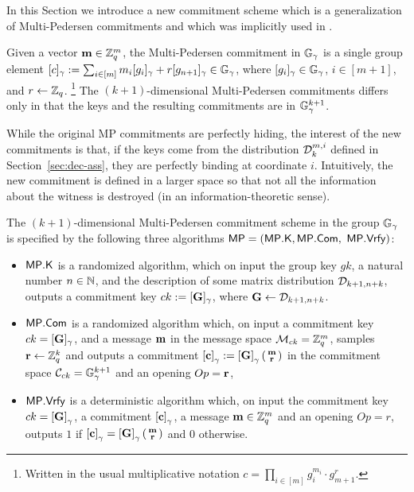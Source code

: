 In this Section we introduce a new commitment scheme which is a generalization of Multi-Pedersen commitments and which was implicitly used in \cite{EPRINT:GonHevRaf15}. 

Given a vector $\mathbf{m}\in\mathbb{Z}_q^m$, the Multi-Pedersen commitment in $\mathbb{G}_{\gamma}$ is a single group element $[c]_\gamma:=\sum_{i\in [m]} m_i[g_i]_\gamma+r[g_{n+1}]_\gamma \in\mathbb{G}_\gamma$, where $[g_i]_{\gamma}\in\mathbb{G}_\gamma$, $i\in[m+1]$, and $r\gets\mathbb{Z}_q$. \footnote{Written in the usual multiplicative notation $c=\prod_{i\in[m]}g_i^{m_i} \cdot g_{m+1}^r$.}  The $(k+1)$-dimensional Multi-Pedersen commitments 
differs only in that the keys and the resulting commitments are in 
$\mathbb{G}_{\gamma}^{k+1}$. 


While the original MP commitments are perfectly hiding, the interest of the new commitments is that, if the keys come from the distribution $\mathcal{D}_k^{m,i}$ defined in Section~\ref{sec:dec-ass}, they are perfectly binding at coordinate $i$. Intuitively, the new commitment is defined in a larger space so that not all the information about the witness is destroyed (in an information-theoretic sense). 

\begin{definition} The $(k+1)$-dimensional Multi-Pedersen commitment scheme in the group $\mathbb{G}_\gamma$ 
is specified by the following three algorithms 
	$\mathsf{MP}=(\mathsf{MP}.\mathsf{K},\mathsf{MP}.\mathsf{Com},$ $ \mathsf{MP}.\mathsf{Vrfy})$:
	\begin{itemize} 
		\item  $\mathsf{MP}.\mathsf{K}$ is a randomized algorithm, which on input the group key $gk$, a natural number $n \in \mathbb{N}$, and the description of some matrix distribution $\mathcal{D}_{k+1,n+k}$, 
		outputs a commitment key $ck:=[\mathbf{{G}}]_\gamma$, where $\mathbf{{G}} \gets \mathcal{D}_{k+1,n+k}$.
		\item $\mathsf{MP}.\mathsf{Com}$ is a randomized algorithm which, on input a commitment key $ck=[\mathbf{{G}}]_\gamma$, and a message 
		$\mathbf{m}$ in the message space $\mathcal{M}_{ck}=\mathbb{Z}_q^{m}$, samples $\mathbf{r} \gets \mathbb{Z}_q^k$ and outputs a commitment $\left[\mathbf{c}\right]_\gamma:=\left[\mathbf{{G}}\right]_\gamma\left(\begin{smallmatrix}\mathbf{m} \\ \mathbf{r}\end{smallmatrix}\right)$ in the commitment space $\mathcal{C}_{ck}=\mathbb{G}_\gamma^{k+1}$ and an opening $Op=\mathbf{r}$, 
		\item $\mathsf{MP}.\mathsf{Vrfy}$ is a deterministic algorithm which, on input the commitment key $ck=\left[\mathbf{{G}}\right]_\gamma$, a commitment $\left[\mathbf{c}\right]_\gamma$,  a message 
		$\mathbf{m} \in \mathbb{Z}_q^{m}$ and an opening $Op=r$, outputs $1$ if $\left[\mathbf{c}\right]_\gamma=\left[\mathbf{{G}}\right]_\gamma\left(\begin{smallmatrix}\mathbf{m} \\ \mathbf{r}\end{smallmatrix}\right)$
		and $0$ otherwise. 
	\end{itemize}
\end{definition}

